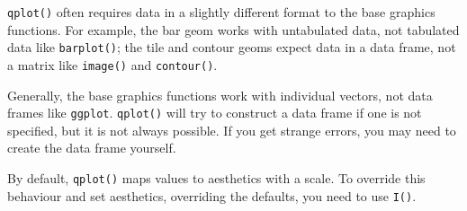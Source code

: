 \texttt{qplot()} often requires data in a slightly different format to
the base graphics functions. For example, the bar geom works with
untabulated data, not tabulated data like \texttt{barplot()}; the tile
and contour geoms expect data in a data frame, not a matrix like
\texttt{image()} and \texttt{contour()}.

\begin{Shaded}
\begin{Highlighting}[]
\NormalTok{(}
 \NormalTok{)}

\NormalTok{(} \NormalTok{, } \NormalTok{)}

  \NormalTok{, } 

  \NormalTok{, } 
\end{Highlighting}
\end{Shaded}

Generally, the base graphics functions work with individual vectors, not
data frames like \texttt{ggplot}. \texttt{qplot()} will try to construct
a data frame if one is not specified, but it is not always possible. If
you get strange errors, you may need to create the data frame yourself.

\begin{Shaded}
\begin{Highlighting}[]
 
\end{Highlighting}
\end{Shaded}

By default, \texttt{qplot()} maps values to aesthetics with a scale. To
override this behaviour and set aesthetics, overriding the defaults, you
need to use \texttt{I()}.

\begin{Shaded}
\begin{Highlighting}[]
 \NormalTok{, } \NormalTok{)}
 \NormalTok{(}\NormalTok{), } \NormalTok{(}\NormalTok{))}
\end{Highlighting}
\end{Shaded}

